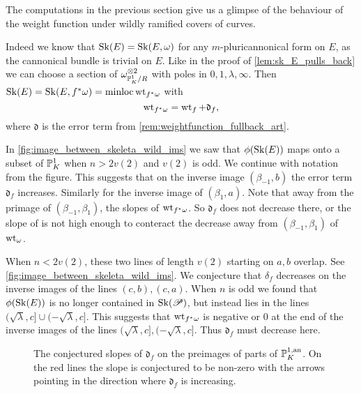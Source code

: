 The computations in the previous section give us a glimpse of the behaviour of the weight function under wildly ramified covers of curves. 

Indeed we know that $\operatorname{Sk}(E) = \operatorname{Sk}(E, \omega)$ for any $m$-pluricannonical form on $E$, as the cannonical bundle is trivial on $E$. 
Like in the proof of \cref{lem:sk_E_pulls_back} we can choose a section of $\omega_{\mathbb{P}^{1}_K  / R} ^{\otimes 2}$ with poles in $0, 1, \lambda, \infty$. 
Then $\operatorname{Sk}(E) = \operatorname{Sk}(E, f^*\omega) = \operatorname{minloc} \operatorname{wt}_{f^* \omega}$ with \[
\operatorname{wt}_{f^*\omega} = \operatorname{wt}_{f} + \mathfrak{d}_f
,\] 
where $\mathfrak{d} $ is the error term from \cref{rem:weightfunction_fullback_art}. 

In \cref{fig:image_between_skeleta_wild_ims} we saw that $\phi(\sk(E))$ maps onto a subset of  $\mathbb{P}^{1}_K$ when $n > 2v(2)$ and $v(2)$ is odd. We continue with notation from the figure.
This suggests that on the inverse image $(\beta_{-1}, b)$ the error term $\mathfrak{d}_f $ increases. 
Similarly for the inverse image of  $(\beta_1, a)$. 
Note that away from the primage of $(\beta_{-1}, \beta_1)$, the slopes of $\operatorname{wt}_{f^*\omega}$. 
So $\mathfrak{d} _f$ does not decrease there, or the slope of is not high enough to conteract the decrease away from $(\beta_{-1}, \beta_1)$ of $\operatorname{wt}_{\omega}$. 

When $n < 2v(2)$, these two lines of length $v(2)$ starting on $a, b$ overlap. See \cref{fig:image_between_skeleta_wild_ims}. 
We conjecture that $\mathfrak{\delta} _f$ decreases on the inverse images of the lines $(c, b), (c, a)$. 
When $n$ is odd we found that $\phi(\sk(E))$ is no longer contained in $\operatorname{Sk}(\mathscr P)$, but instead lies in the lines $(\sqrt{\lambda}, c]\cup (-\sqrt{\lambda} , c]  $. 
This suggests that $\operatorname{wt}_{f^*\omega}$ is negative or 0 at the end of the inverse images of the lines $(\sqrt{\lambda}, c], (-\sqrt{\lambda}, c]$. 
Thus $\mathfrak{d} _f$ must decrease here. 

\begin{figure}[ht]
    \centering
    \caption{The conjectured slopes of $\mathfrak{d} _f$ on the preimages of parts of $\mathbb{P}^{1, \text{an}}_K$.
    On the red lines the slope is conjectured to be non-zero with the arrows pointing in the direction where $\mathfrak{d}_f $ is increasing. }
    \label{fig:slope-log-different}
\end{figure}


 
